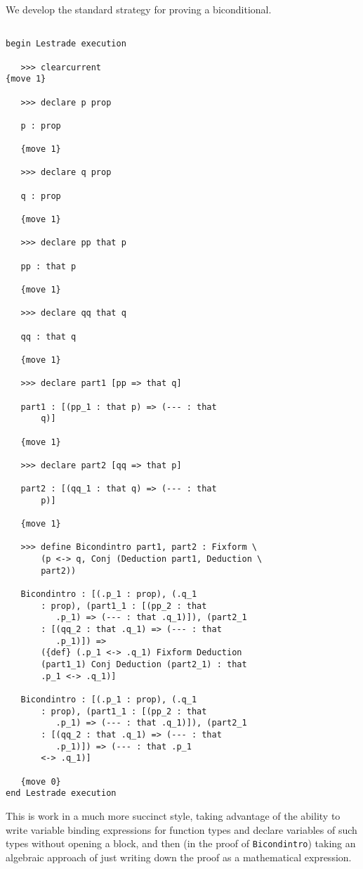 \documentclass[12pt]{article}
\begin{document}
We develop the standard strategy for proving a biconditional.

\begin{verbatim}

begin Lestrade execution

   >>> clearcurrent
{move 1}

   >>> declare p prop

   p : prop

   {move 1}

   >>> declare q prop

   q : prop

   {move 1}

   >>> declare pp that p

   pp : that p

   {move 1}

   >>> declare qq that q

   qq : that q

   {move 1}

   >>> declare part1 [pp => that q]

   part1 : [(pp_1 : that p) => (--- : that 
       q)]

   {move 1}

   >>> declare part2 [qq => that p]

   part2 : [(qq_1 : that q) => (--- : that 
       p)]

   {move 1}

   >>> define Bicondintro part1, part2 : Fixform \
       (p <-> q, Conj (Deduction part1, Deduction \
       part2))

   Bicondintro : [(.p_1 : prop), (.q_1 
       : prop), (part1_1 : [(pp_2 : that 
          .p_1) => (--- : that .q_1)]), (part2_1 
       : [(qq_2 : that .q_1) => (--- : that 
          .p_1)]) => 
       ({def} (.p_1 <-> .q_1) Fixform Deduction 
       (part1_1) Conj Deduction (part2_1) : that 
       .p_1 <-> .q_1)]

   Bicondintro : [(.p_1 : prop), (.q_1 
       : prop), (part1_1 : [(pp_2 : that 
          .p_1) => (--- : that .q_1)]), (part2_1 
       : [(qq_2 : that .q_1) => (--- : that 
          .p_1)]) => (--- : that .p_1 
       <-> .q_1)]

   {move 0}
end Lestrade execution

\end{verbatim}

This is work in a much more succinct style, taking advantage of the ability to write variable binding expressions
for function types and declare variables of such types without opening a block, and then (in the proof of {\tt Bicondintro})
taking an algebraic approach of just writing down the proof as a mathematical expression.
\end{document}
